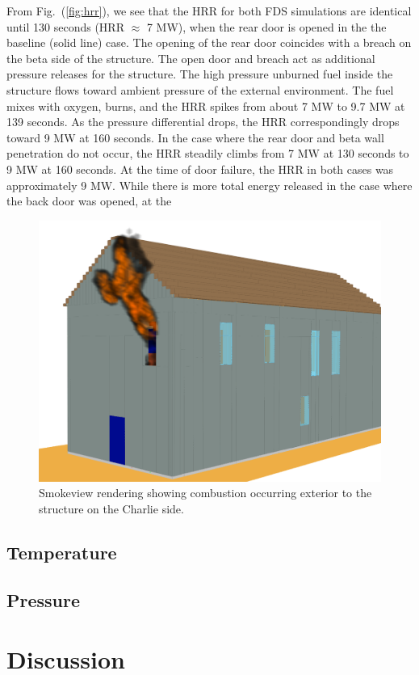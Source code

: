 \documentclass[11pt,oneside]{book}
\begin{document}
From Fig.~(\ref{fig:hrr}), we see that the HRR for both FDS simulations are identical until 130 seconds (HRR $\approx$ 7 MW), when the rear door is opened in the the baseline (solid line) case. The opening of the rear door coincides with a breach on the beta side of the structure. 
The open door and breach act as additional pressure releases for the structure. The high pressure unburned fuel inside the structure flows toward ambient pressure of the external environment. The fuel mixes with oxygen, burns, and the HRR spikes from about 7 MW to 9.7 MW at 139 seconds. As the pressure differential drops, the HRR correspondingly drops toward 9 MW at 160 seconds. In the case where the rear door and beta wall penetration do not occur, the HRR steadily climbs from 7 MW at 130 seconds to 9 MW at 160 seconds.
At the time of door failure, the HRR in both cases was approximately 9 MW. While there is more total energy released in the case where the back door was opened, at the 

\begin{figure}[h!]
\centering
\includegraphics[width=.80\textwidth]{../Figures/smv_exterior_fire}
\caption{Smokeview rendering showing combustion occurring exterior to the structure on the Charlie side.}
\label{fig:smv_ext_fire}
\end{figure}

\section{Temperature}

\section{Pressure}

\chapter{Discussion}
\end{document}
